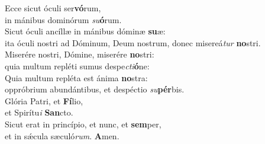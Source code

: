 \evenverse Ecce sicut óculi ser\textbf{vó}rum,~\*\\
\evenverse in mánibus dominórum \textit{su}\textbf{ó}rum.\\
\oddverse Sicut óculi ancíllæ in mánibus dóminæ \textbf{su}æ:~\*\\
\oddverse ita óculi nostri ad Dóminum, Deum nostrum, donec misereá\textit{tur} \textbf{no}stri.\\
\evenverse Miserére nostri, Dómine, miserére \textbf{no}stri:~\*\\
\evenverse quia multum repléti sumus despe\textit{cti}\textbf{ó}ne:\\
\oddverse Quia multum repléta est ánima \textbf{no}stra:~\*\\
\oddverse oppróbrium abundántibus, et despéctio \textit{su}\textbf{pér}bis.\\
\evenverse Glória Patri, et \textbf{Fí}lio,~\*\\
\evenverse et Spirítu\textit{i} \textbf{San}cto.\\
\oddverse Sicut erat in princípio, et nunc, et \textbf{sem}per,~\*\\
\oddverse et in sǽcula sæculó\textit{rum}. \textbf{A}men.\\
